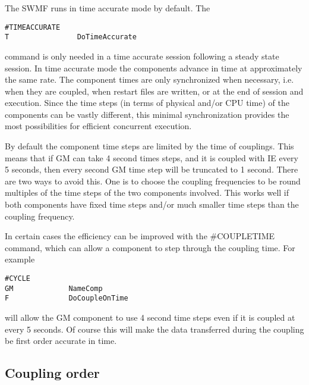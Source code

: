 The SWMF runs in time accurate mode by default. The
\begin{verbatim}
#TIMEACCURATE
T                DoTimeAccurate
\end{verbatim}
command is only needed in a time accurate session following a 
steady state session.
In time accurate mode the components advance in time at
approximately the same rate. The component times are
only synchronized when necessary, i.e. when they
are coupled, when restart files are written, or 
at the end of session and execution. Since the time
steps (in terms of physical and/or CPU time) of the components can be 
vastly different, this minimal synchronization provides the 
most possibilities for efficient concurrent execution.

By default the component time steps are limited by the
time of couplings. This means that if GM can take 4 second
times steps, and it is coupled with IE every 5 seconds,
then every second GM time step will be truncated to 1 second.
There are two ways to avoid this. One is to choose the
coupling frequencies to be round multiples of the time steps
of the two components involved. This works well if both components
have fixed time steps and/or much smaller time steps than the 
coupling frequency.

In certain cases the efficiency can be improved with the
\#COUPLETIME command, which can allow a component to 
step through the coupling time. For example
\begin{verbatim}
#CYCLE
GM             NameComp
F              DoCoupleOnTime
\end{verbatim}
will allow the GM component to use 4 second time steps even
if it is coupled at every 5 seconds. Of course this will
make the data transferred during the coupling be 
first order accurate in time.

\subsection{Coupling order}

